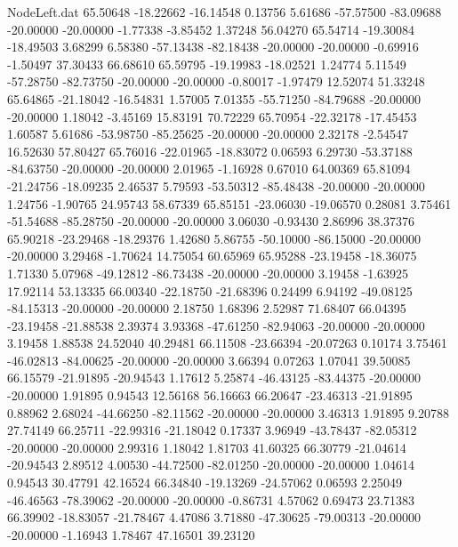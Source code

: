 \begin{filecontents}{NodeLeft.dat}
  65.50648  -18.22662  -16.14548     0.13756    5.61686  -57.57500  -83.09688  -20.00000  -20.00000   -1.77338   -3.85452    1.37248   56.04270
  65.54714  -19.30084  -18.49503     3.68299    6.58380  -57.13438  -82.18438  -20.00000  -20.00000   -0.69916   -1.50497   37.30433   66.68610
  65.59795  -19.19983  -18.02521     1.24774    5.11549  -57.28750  -82.73750  -20.00000  -20.00000   -0.80017   -1.97479   12.52074   51.33248
  65.64865  -21.18042  -16.54831     1.57005    7.01355  -55.71250  -84.79688  -20.00000  -20.00000    1.18042   -3.45169   15.83191   70.72229
  65.70954  -22.32178  -17.45453     1.60587    5.61686  -53.98750  -85.25625  -20.00000  -20.00000    2.32178   -2.54547   16.52630   57.80427
  65.76016  -22.01965  -18.83072     0.06593    6.29730  -53.37188  -84.63750  -20.00000  -20.00000    2.01965   -1.16928    0.67010   64.00369
  65.81094  -21.24756  -18.09235     2.46537    5.79593  -53.50312  -85.48438  -20.00000  -20.00000    1.24756   -1.90765   24.95743   58.67339
  65.85151  -23.06030  -19.06570     0.28081    3.75461  -51.54688  -85.28750  -20.00000  -20.00000    3.06030   -0.93430    2.86996   38.37376
  65.90218  -23.29468  -18.29376     1.42680    5.86755  -50.10000  -86.15000  -20.00000  -20.00000    3.29468   -1.70624   14.75054   60.65969
  65.95288  -23.19458  -18.36075     1.71330    5.07968  -49.12812  -86.73438  -20.00000  -20.00000    3.19458   -1.63925   17.92114   53.13335
  66.00340  -22.18750  -21.68396     0.24499    6.94192  -49.08125  -84.15313  -20.00000  -20.00000    2.18750    1.68396    2.52987   71.68407
  66.04395  -23.19458  -21.88538     2.39374    3.93368  -47.61250  -82.94063  -20.00000  -20.00000    3.19458    1.88538   24.52040   40.29481
  66.11508  -23.66394  -20.07263     0.10174    3.75461  -46.02813  -84.00625  -20.00000  -20.00000    3.66394    0.07263    1.07041   39.50085
  66.15579  -21.91895  -20.94543     1.17612    5.25874  -46.43125  -83.44375  -20.00000  -20.00000    1.91895    0.94543   12.56168   56.16663
  66.20647  -23.46313  -21.91895     0.88962    2.68024  -44.66250  -82.11562  -20.00000  -20.00000    3.46313    1.91895    9.20788   27.74149
  66.25711  -22.99316  -21.18042     0.17337    3.96949  -43.78437  -82.05312  -20.00000  -20.00000    2.99316    1.18042    1.81703   41.60325
  66.30779  -21.04614  -20.94543     2.89512    4.00530  -44.72500  -82.01250  -20.00000  -20.00000    1.04614    0.94543   30.47791   42.16524
  66.34840  -19.13269  -24.57062     0.06593    2.25049  -46.46563  -78.39062  -20.00000  -20.00000   -0.86731    4.57062    0.69473   23.71383
  66.39902  -18.83057  -21.78467     4.47086    3.71880  -47.30625  -79.00313  -20.00000  -20.00000   -1.16943    1.78467   47.16501   39.23120

\end{filecontents}
